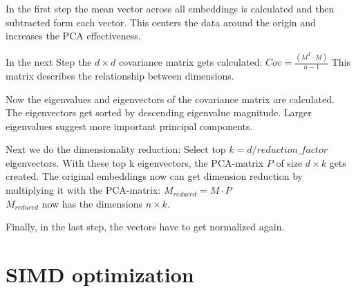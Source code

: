 In the first step the mean vector across all embeddings is calculated and then subtracted form each vector. This centers the data around the origin and increases the PCA effectiveness.

In the next Step the $d \times d$ covariance matrix gets calculated: $Cov = \frac{(M^T \cdot M)}{n-1}$
This matrix describes the relationship between dimensions.

Now the eigenvalues and eigenvectors of the covariance matrix are calculated. The eigenvectors get sorted by descending eigenvalue magnitude. Larger eigenvalues suggest more important principal components.

Next we do the dimensionality reduction: Select top $k = d / reduction\_factor$ eigenvectors.
With these top k eigenvectors, the PCA-matrix $P$ of size $d \times k$ gets created. The original embeddings now can get dimension reduction by multiplying it with the PCA-matrix: $M_{reduced} = M \cdot P$\\
$M_{reduced}$ now has the dimensions $n \times k$.

Finally, in the last step, the vectors have to get normalized again.

\section{SIMD optimization}
